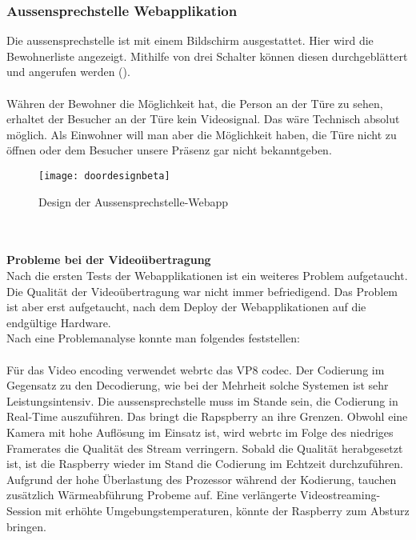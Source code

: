 \subsubsection{Aussensprechstelle Webapplikation}
Die \gls{aussensprechstelle} ist mit einem Bildschirm ausgestattet. Hier wird die Bewohnerliste angezeigt. Mithilfe von drei Schalter können diesen durchgeblättert und angerufen werden ().
\\
\\
Währen der Bewohner die Möglichkeit hat, die Person an der Türe zu sehen, erhaltet der Besucher an der Türe kein Videosignal. Das wäre Technisch absolut möglich. Als Einwohner will man aber die Möglichkeit haben, die Türe nicht zu öffnen oder dem Besucher unsere Präsenz gar nicht bekanntgeben. 
\begin{figure}[htb!]
	\begin{center}
		\texttt{[image: doordesignbeta]}
		\caption[Design der Client-Webapp]{Design der Aussensprechstelle-Webapp}
		\label{fig:doordesign}
	\end{center}
\end{figure}
\\
\\
\textbf{Probleme bei der Videoübertragung}
\\
Nach die ersten Tests der Webapplikationen ist ein weiteres Problem aufgetaucht. Die Qualität der Videoübertragung war nicht immer befriedigend. Das Problem ist aber erst aufgetaucht, nach dem Deploy der Webapplikationen auf die endgültige Hardware.
\\Nach eine Problemanalyse konnte man folgendes feststellen:
\\
\\
Für das Video encoding verwendet \gls{webrtc} das VP8 codec. Der Codierung im Gegensatz zu den Decodierung, wie bei der Mehrheit solche Systemen ist sehr Leistungsintensiv. Die \gls{aussensprechstelle} muss im Stande sein, die Codierung in Real-Time auszuführen. Das bringt die Rapspberry  an ihre Grenzen. Obwohl eine Kamera mit hohe Auflösung im Einsatz ist, wird \gls{webrtc} im Folge des niedriges Framerates die Qualität des Stream verringern. Sobald die Qualität herabgesetzt ist, ist die Raspberry wieder im Stand die Codierung im Echtzeit durchzuführen.
\\
Aufgrund der hohe Überlastung des Prozessor während der Kodierung, tauchen zusätzlich Wärmeabführung Probeme auf. Eine verlängerte Videostreaming-Session mit erhöhte Umgebungstemperaturen, könnte der Raspberry zum Absturz bringen.
